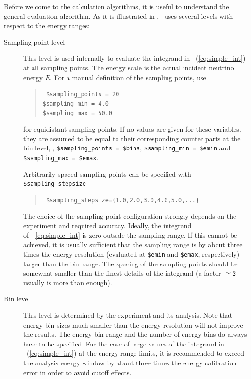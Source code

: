 Before we come to the calculation algorithms, it is useful to understand
the general evaluation algorithm. As it is illustrated in , 
\GLOBES\ uses several levels with respect to the energy ranges:
\begin{description}
\item[Sampling point level]
 This level is used internally to evaluate the integrand in \eq~(\ref{eq:simple_int}) at all sampling points. The energy scale is the actual incident neutrino energy $E$. 
For a manual definition of the sampling points, use
\begin{quote}
{\tt
\$sampling\_points = 20\\
\$sampling\_min =          4.0\\
\$sampling\_max =         50.0
}
\end{quote}
for equidistant sampling points. If no values are given for these variables,
they are assumed to be equal to their corresponding counter parts at the bin level,
\ie , \verb+$sampling_points = $bins+, \verb+$sampling_min = $emin+ and
\verb+$sampling_max = $emax+.


Arbitrarily spaced sampling points can 
be specified with 
{\tt \$sampling\_stepsize}
\begin{quote}
{\tt
\$sampling\_stepsize=\{1.0,2.0,3.0,4.0,5.0,...\}
}
\end{quote}
The choice of the sampling point configuration strongly depends on the 
experiment and required accuracy. Ideally, the integrand 
of~\eq~\ref{eq:simple_int} is zero outside the sampling range. If this cannot
be achieved, it is usually sufficient that the sampling range is by about
three times the energy resolution (evaluated at {\tt \$emin} and
{\tt \$emax}, respectively) larger than the bin range. 
The spacing of the sampling points should be somewhat smaller than the 
finest details of the integrand (a factor 
$\simeq 2$ usually is more than enough).



\item[Bin level] This level is determined by the experiment and its analysis. 
Note that energy
bin sizes much smaller than the energy resolution will not improve the results. The energy bin range and the number of energy bins do always have to be specified. For the case of large values of the integrand in \eq~(\ref{eq:simple_int}) at the energy range limits, it is recommended to exceed the analysis energy window by about three times the energy calibration error in order 
to avoid cutoff effects.


\end{description}
